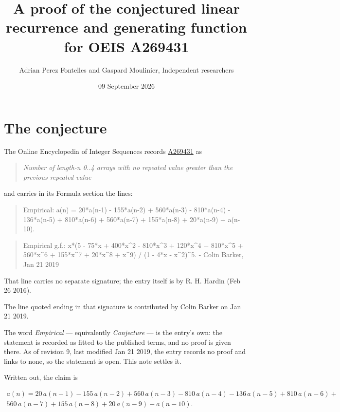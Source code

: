 \documentclass[11pt]{article}
\title{A proof of the conjectured linear recurrence and generating function for OEIS A269431}
\author{Adrian Perez Fontelles and Gaspard Moulinier, Independent researchers}
\date{09 September 2026}
\theoremstyle{definition}
\begin{document}
\maketitle
\section{The conjecture}

The Online Encyclopedia of Integer Sequences records \href{https://oeis.org/A269431}{A269431} as

\begin{quote}\itshape Number of length-n 0..4 arrays with no repeated value greater than the previous repeated value\end{quote}

and carries in its Formula section the lines:

\begin{quote}\ttfamily Empirical: a(n) = 20*a(n-1) - 155*a(n-2) + 560*a(n-3) - 810*a(n-4) - 136*a(n-5) + 810*a(n-6) + 560*a(n-7) + 155*a(n-8) + 20*a(n-9) + a(n-10).\end{quote}

\begin{quote}\ttfamily Empirical g.f.: x*(5 - 75*x + 400*x\textasciicircum{}2 - 810*x\textasciicircum{}3 + 120*x\textasciicircum{}4 + 810*x\textasciicircum{}5 + 560*x\textasciicircum{}6 + 155*x\textasciicircum{}7 + 20*x\textasciicircum{}8 + x\textasciicircum{}9) / (1 - 4*x - x\textasciicircum{}2)\textasciicircum{}5. - Colin Barker, Jan 21 2019\end{quote}

That line carries no separate signature; the entry itself is by R. H. Hardin (Feb 26 2016).

The line quoted ending in that signature is contributed by Colin Barker on Jan 21 2019.

The word {\itshape Empirical} --- equivalently {\itshape Conjecture} --- is the entry's own: the statement is recorded as fitted to the published terms, and no proof is given there. As of revision 9, last modified Jan 21 2019, the entry records no proof and links to none, so the statement is open. This note settles it.

Written out, the claim is

\begin{multline*} a(n) = 20\,a(n-1) - 155\,a(n-2) + 560\,a(n-3) - 810\,a(n-4) - 136\,a(n-5) + 810\,a(n-6) + \\ 560\,a(n-7) + 155\,a(n-8) + 20\,a(n-9) + a(n-10). \end{multline*}
\end{document}
